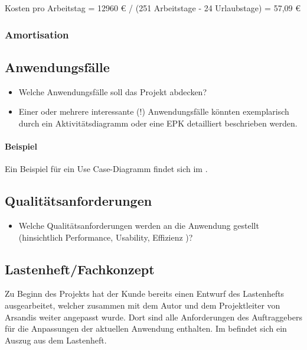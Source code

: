 Kosten pro Arbeitstag = 12960 € / (251 Arbeitstage - 24 Urlaubstage) = 57,09 €



\subsubsection{Amortisation}

\subsection{Anwendungsfälle}
\label{sec:Anwendungsfaelle}
\begin{itemize}
	\item Welche Anwendungsfälle soll das Projekt abdecken?
	\item Einer oder mehrere interessante (!) Anwendungsfälle könnten exemplarisch durch ein Aktivitätsdiagramm oder eine EPK detailliert beschrieben werden.
\end{itemize}

\paragraph{Beispiel}
Ein Beispiel für ein Use Case-Diagramm findet sich im .


\subsection{Qualitätsanforderungen}
\label{sec:Qualitaetsanforderungen}
\begin{itemize}
	\item Welche Qualitätsanforderungen werden an die Anwendung gestellt (\zB hinsichtlich Performance, Usability, Effizienz \etc )?
\end{itemize}


\subsection{Lastenheft/Fachkonzept}
\label{sec:Lastenheft}
Zu Beginn des Projekts hat der Kunde bereits einen Entwurf des Lastenhefts ausgearbeitet, welcher zusammen mit dem Autor und dem Projektleiter von Arsandis weiter angepasst wurde.
Dort sind alle Anforderungen des Auftraggebers für die Anpassungen der aktuellen Anwendung enthalten.
Im  befindet sich ein Auszug aus dem Lastenheft.
